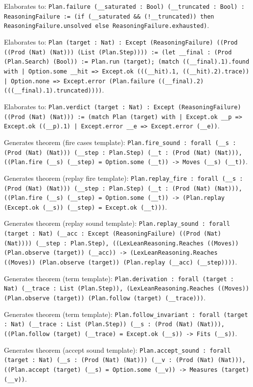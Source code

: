 \documentclass[11pt]{article}
\begin{document}
\noindent Elaborates to: \texttt{Plan.failure (\_\_saturated : Bool) (\_\_truncated : Bool) : ReasoningFailure := (if (\_\_saturated \&\& (!\_\_truncated)) then ReasoningFailure.unsolved else ReasoningFailure.exhausted)}.\par
\noindent Elaborates to: \texttt{Plan (target : Nat) : Except (ReasoningFailure) ((Prod ((Prod (Nat) (Nat))) (List (Plan.Step)))) := (let \_\_final : (Prod (Plan.Search) (Bool)) := Plan.run (target); (match ((\_\_final).1).found with | Option.some \_\_hit => Except.ok (((\_\_hit).1, ((\_\_hit).2).trace)) | Option.none => Except.error (Plan.failure ((\_\_final).2) (((\_\_final).1).truncated))))}.\par
\noindent Elaborates to: \texttt{Plan.verdict (target : Nat) : Except (ReasoningFailure) ((Prod (Nat) (Nat))) := (match Plan (target) with | Except.ok \_\_p => Except.ok ((\_\_p).1) | Except.error \_\_e => Except.error (\_\_e))}.\par
\noindent Generates theorem (fire cases template): \texttt{Plan.fire\_sound : forall (\_\_s : (Prod (Nat) (Nat))) (\_\_step : Plan.Step) (\_\_t : (Prod (Nat) (Nat))), ((Plan.fire (\_\_s) (\_\_step) = Option.some (\_\_t)) -> Moves (\_\_s) (\_\_t))}.\par
\noindent Generates theorem (replay fire template): \texttt{Plan.replay\_fire : forall (\_\_s : (Prod (Nat) (Nat))) (\_\_step : Plan.Step) (\_\_t : (Prod (Nat) (Nat))), ((Plan.fire (\_\_s) (\_\_step) = Option.some (\_\_t)) -> (Plan.replay (Except.ok (\_\_s)) (\_\_step) = Except.ok (\_\_t)))}.\par
\noindent Generates theorem (replay sound template): \texttt{Plan.replay\_sound : forall (target : Nat) (\_\_acc : Except (ReasoningFailure) ((Prod (Nat) (Nat)))) (\_\_step : Plan.Step), ((LexLeanReasoning.Reaches ((Moves)) (Plan.observe (target)) (\_\_acc)) -> (LexLeanReasoning.Reaches ((Moves)) (Plan.observe (target)) (Plan.replay (\_\_acc) (\_\_step))))}.\par
\noindent Generates theorem (term template): \texttt{Plan.derivation : forall (target : Nat) (\_\_trace : List (Plan.Step)), (LexLeanReasoning.Reaches ((Moves)) (Plan.observe (target)) (Plan.follow (target) (\_\_trace)))}.\par
\noindent Generates theorem (term template): \texttt{Plan.follow\_invariant : forall (target : Nat) (\_\_trace : List (Plan.Step)) (\_\_s : (Prod (Nat) (Nat))), ((Plan.follow (target) (\_\_trace) = Except.ok (\_\_s)) -> Fits (\_\_s))}.\par
\noindent Generates theorem (accept sound template): \texttt{Plan.accept\_sound : forall (target : Nat) (\_\_s : (Prod (Nat) (Nat))) (\_\_v : (Prod (Nat) (Nat))), ((Plan.accept (target) (\_\_s) = Option.some (\_\_v)) -> Measures (target) (\_\_v))}.\par
\end{document}
